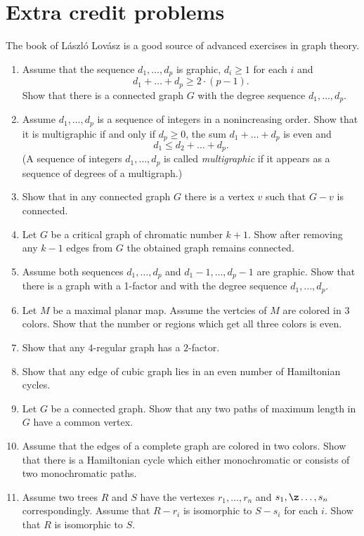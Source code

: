 \chapter{Extra credit problems}

The book of L\'aszl\'o Lov\'asz \cite{lovasz} is a good source of advanced exercises in graph theory.

\begin{enumerate}
\item Assume that the sequence $d_1,\dots, d_p$ is graphic,
$d_i\ge 1$ for each $i$ and 
\[d_1+\dots+d_p\ge 2\cdot(p-1).\]
Show that there is a connected graph $G$ with the degree sequence $d_1,\dots, d_p$.
\item Assume $d_1,\dots, d_p$ is a sequence of integers in a nonincreasing order.
Show that it is multigraphic if and only if $d_p\ge0$, the sum $d_1+\dots+ d_p$ is even and 
\[d_1\le d_2+\dots+d_p.\]
(A sequence of integers $d_1,\dots, d_p$ is called \textit{multigraphic} if it appears as a sequence of degrees of a multigraph.)
\item Show that in any connected graph $G$ there is a vertex $v$ such that $G-v$ is connected.
\item Let $G$ be a critical graph of chromatic number $k+1$.
Show after removing any $k-1$ edges from $G$  
the obtained graph remains connected. 
\item Assume both sequences $d_1,\dots, d_p$
 and $d_1-1,\dots, d_p-1$ are graphic.
Show that there is a graph with a 1-factor and with the degree sequence $d_1,\dots, d_p$.
\item Let $M$ be a maximal planar map.
Assume the vertcies of $M$ are colored in 3 colors.
Show that the number or regions which get all three colors is even.
\item Show that any $4$-regular graph has a $2$-factor.
\item Show that any edge of cubic graph lies in an even number of Hamiltonian cycles.
\item Let $G$ be a  connected graph.
Show that any two paths of maximum length in $G$ have a common vertex.
\item Assume that the edges of a complete graph are colored in two colors.
Show that there is a Hamiltonian cycle which either monochromatic or consists of two monochromatic paths.
\item Assume two trees $R$ and $S$ 
have the vertexes $r_1,\dots,r_n$ and $s_1,\z\dots,s_n$ correspondingly.
Assume that $R-r_i$ is isomorphic to $S-s_i$ for each $i$.
Show that $R$ is isomorphic to $S$.

\end{enumerate}
